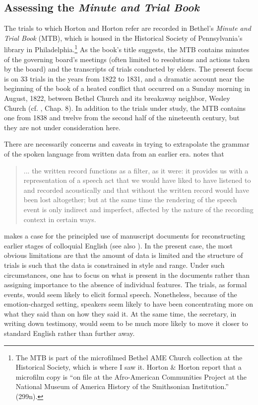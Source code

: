 \documentclass[output=paper,colorlinks,citecolor=brown]{langscibook}
\begin{document}
\subsection{Assessing the \textit{Minute and Trial Book} }

The trials to which Horton and Horton refer are recorded in Bethel’s \textit{Minute and Trial Book} (MTB), which is housed in the Historical Society of Pennsylvania’s library in Philadelphia.\footnote{The MTB is part of the microfilmed Bethel AME Church collection at the Historical Society, which is where I saw it. Horton \& Horton report that a microfilm copy is “on file at the Afro-American Communities Project at the National Museum of America History of the Smithsonian Institution.” (299n).} As the book’s title suggests, the MTB contains minutes of the governing board’s meetings (often limited to resolutions and actions taken by the board) and the transcripts of trials conducted by elders. The present focus is on 33 trials in the years from 1822 to 1831, and a dramatic account near the beginning of the book of a heated conflict that occurred on a Sunday morning in August, 1822, between Bethel Church and its breakaway neighbor, Wesley Church (cf. \citealt{prophetNewman2008}, Chap. 8). In addition to the trials under study, the MTB contains one from 1838 and twelve from the second half of the nineteenth century, but they are not under consideration here.

There are necessarily concerns and caveats in trying to extrapolate the grammar of the spoken language from written data from an earlier era. \citet[57]{schneider2013investigating} notes that
\begin{quote}
 ...  the written record functions as a filter, as it were: it provides us with a representation of a speech act that we would have liked to have listened to and recorded acoustically and that without the written record would have been lost altogether; but at the same time the rendering of the speech event is only indirect and imperfect, affected by the nature of the recording context in certain ways.   
\end{quote}
 

\citet[1]{Montgomery1999} makes a case for the principled use of manuscript documents for reconstructing earlier stages of colloquial English (see also \citealt{WolframThomas2002}). In the present case, the most obvious limitations are that the amount of data is limited and the structure of trials is such that the data is constrained in style and range. Under such circumstances, one has to focus on what is present in the documents rather than assigning importance to the absence of individual features. The trials, as formal events, would seem likely to elicit formal speech. Nonetheless, because of the emotion-charged setting, speakers seem likely to have been concentrating more on what they said than on how they said it. At the same time, the secretary, in writing down testimony, would seem to be much more likely to move it closer to standard English rather than further away. 
\end{document}
